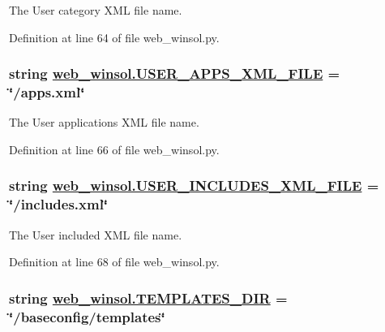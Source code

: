 The User category XML file name. 



Definition at line 64 of file web\_\-winsol.py.\hypertarget{namespaceweb__winsol_511aeb82672612c294251d44ca2f772c}{
\subsubsection[USER\_\-APPS\_\-XML\_\-FILE]{\setlength{\rightskip}{0pt plus 5cm}string \hyperlink{namespaceweb__winsol_511aeb82672612c294251d44ca2f772c}{web\_\-winsol.USER\_\-APPS\_\-XML\_\-FILE} = \char`\"{}/apps.xml\char`\"{}}}
\label{namespaceweb__winsol_511aeb82672612c294251d44ca2f772c}


The User applications XML file name. 



Definition at line 66 of file web\_\-winsol.py.\hypertarget{namespaceweb__winsol_e8acc57c07acda4120cd31fcba0855f9}{
\subsubsection[USER\_\-INCLUDES\_\-XML\_\-FILE]{\setlength{\rightskip}{0pt plus 5cm}string \hyperlink{namespaceweb__winsol_e8acc57c07acda4120cd31fcba0855f9}{web\_\-winsol.USER\_\-INCLUDES\_\-XML\_\-FILE} = \char`\"{}/includes.xml\char`\"{}}}
\label{namespaceweb__winsol_e8acc57c07acda4120cd31fcba0855f9}


The User included XML file name. 



Definition at line 68 of file web\_\-winsol.py.\hypertarget{namespaceweb__winsol_d6dd82765ddcc490f6ca47aaf25bb634}{
\subsubsection[TEMPLATES\_\-DIR]{\setlength{\rightskip}{0pt plus 5cm}string \hyperlink{namespaceweb__winsol_d6dd82765ddcc490f6ca47aaf25bb634}{web\_\-winsol.TEMPLATES\_\-DIR} = \char`\"{}/baseconfig/templates\char`\"{}}}
\label{namespaceweb__winsol_d6dd82765ddcc490f6ca47aaf25bb634}


